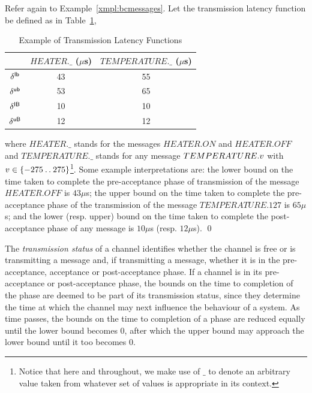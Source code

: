 \begin{exampleb}
Refer again to Example~\ref{xmpl:bcmessages}. Let the transmission latency
function be defined as in Table~\ref{tab:bclatency}, 
\begin{table} 
\begin{center}
\begin{tabular}{|c||c|c|}
\hline \hline
& $HEATER.\_$ ($\mu$s) & $TEMPERATURE.\_$ ($\mu$s) \\
\hline
${\delta^{{\sf lb}}}$ & 43 & 55 \\
${\delta^{{\sf ub}}}$ & 53 & 65 \\
${\delta^{{\sf lB}}}$ & 10 & 10 \\
${\delta^{{\sf uB}}}$ & 12 & 12 \\
\hline \hline
\end{tabular}
\end{center}
\caption{Example of Transmission Latency Functions\label{tab:bclatency}}
\end{table}
where $HEATER.\_$ stands for the messages $HEATER.ON$ and $HEATER.OFF$
and $TEMPERATURE.\_$ stands for any message $TEMPERATURE.{v}$ with
${v} \in \{-275 \mathbin{\ldotp\ldotp} 275\}$\footnote{Notice that here and throughout,
we make use of $\mathbf{\_}$ to denote an arbitrary value taken from
whatever set of values is appropriate in its context.}. Some example
interpretations are: the lower bound on the time taken to complete the
pre-acceptance phase of transmission of the message $HEATER.OFF$ is
$43\mu$s; the upper bound on the time taken to complete the
pre-acceptance phase of the transmission of the message
$TEMPERATURE.127$ is $65\mu$s; and the lower (resp. upper) bound on
the time taken to complete the post-acceptance phase of any message is
$10\mu$s (resp. $12\mu$s).
\qed
\end{exampleb}

The \emph{transmission status} of a channel identifies whether the
channel is free or is transmitting a message and, if transmitting a
message, whether it is in the pre-acceptance, acceptance or
post-acceptance phase.  If a channel is in its
pre-acceptance or post-acceptance phase, the bounds on the time to
completion of the phase are deemed to be part of its
transmission status, since they determine the time at which the
channel may next influence the behaviour of a system.  As time
passes, the bounds on the time to completion of a phase are reduced
equally until the lower bound becomes 0, after which the upper bound
may approach the lower bound until it too becomes 0.


